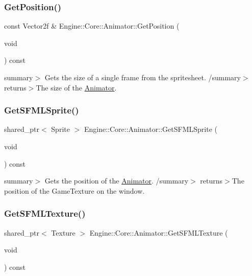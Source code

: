 \subsubsection{\texorpdfstring{Get\+Position()}{GetPosition()}}
{\footnotesize\ttfamily const Vector2f \& Engine\+::\+Core\+::\+Animator\+::\+Get\+Position (\begin{DoxyParamCaption}\item[{void}]{ }\end{DoxyParamCaption}) const}

summary$>$ Gets the size of a single frame from the spritesheet. /summary$>$ returns$>$The size of the \hyperlink{class_engine_1_1_core_1_1_animator}{Animator}.\mbox{\label{class_engine_1_1_core_1_1_animator_a50aef70515ac26985da30be5fc5247a1}} 
\subsubsection{\texorpdfstring{Get\+S\+F\+M\+L\+Sprite()}{GetSFMLSprite()}}
{\footnotesize\ttfamily shared\+\_\+ptr$<$ Sprite $>$ Engine\+::\+Core\+::\+Animator\+::\+Get\+S\+F\+M\+L\+Sprite (\begin{DoxyParamCaption}\item[{void}]{ }\end{DoxyParamCaption}) const}

summary$>$ Gets the position of the \hyperlink{class_engine_1_1_core_1_1_animator}{Animator}. /summary$>$ returns$>$The position of the Game\+Texture on the window.\mbox{\label{class_engine_1_1_core_1_1_animator_a6a87289d258c863d02a3bee22074e92f}} 
\subsubsection{\texorpdfstring{Get\+S\+F\+M\+L\+Texture()}{GetSFMLTexture()}}
{\footnotesize\ttfamily shared\+\_\+ptr$<$ Texture $>$ Engine\+::\+Core\+::\+Animator\+::\+Get\+S\+F\+M\+L\+Texture (\begin{DoxyParamCaption}\item[{void}]{ }\end{DoxyParamCaption}) const}

